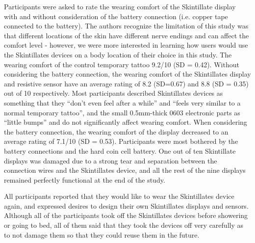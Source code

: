 \documentclass{sigchi}
\begin{document}
Participants were asked to rate the wearing comfort of the Skintillate display with and without consideration of the battery connection (i.e. copper tape connected to the battery). The authors recognize the limitation of this study was that different locations of the skin have different nerve endings and can affect the comfort level - however, we were more interested in learning how users would use the Skintillates devices on a body location of their choice in this study. The wearing comfort of the control temporary tattoo 9.2/10 (SD = 0.42). Without considering the battery connection, the wearing comfort of the Skintillates display and resistive sensor have an average rating of 8.2 (SD=0.67) and 8.8 (SD = 0.35) out of 10 respectively. Most participants described Skintillates devices as something that they ``don't even feel after a while'' and ``feels very similar to a normal temporary tattoo'', and the small 0.5mm-thick 0603 electronic parts as ``little bumps'' and do not significantly affect wearing comfort. When considering the battery connection, the wearing comfort of the display decreased to an average rating of 7.1/10 (SD = 0.53). Participants were most bothered by the battery connections and the hard coin cell battery. One out of ten Skintillate displays was damaged due to a strong tear and separation between the connection wires and the Skintillates device, and all the rest of the nine displays remained perfectly functional at the end of the study.

All participants reported that they would like to wear the Skintillates device again, and expressed desires to design their own Skintillates displays and sensors. Although all of the participants took off the Skintillates devices before showering or going to bed, all of them said that they took the devices off very carefully as to not damage them so that they could reuse them in the future. 
\end{document}

